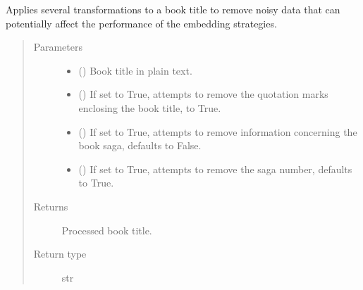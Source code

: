 \documentclass[letterpaper,10pt,english]{sphinxmanual}
\begin{document}
\begin{fulllineitems}
\label{\detokenize{code:code_utils.utils.clean_book_title}}
Applies several transformations to a book title to remove noisy data that
can potentially affect the performance of the embedding strategies.
\begin{quote}\begin{description}
\item[{Parameters}] \leavevmode\begin{itemize}
\item {} 
 () \textendash{} Book title in plain text.

\item {} 
 (\sphinxstyleliteralemphasis{\sphinxupquote{, }}) \textendash{} If set to True, attempts to remove the quotation
marks enclosing the book title, to True.

\item {} 
 (\sphinxstyleliteralemphasis{\sphinxupquote{, }}) \textendash{} If set to True, attempts to remove information concerning
the book saga, defaults to False.

\item {} 
 (\sphinxstyleliteralemphasis{\sphinxupquote{, }}) \textendash{} If set to True, attempts to remove the saga number,
defaults to True.

\end{itemize}

\item[{Returns}] \leavevmode
Processed book title.

\item[{Return type}] \leavevmode
str

\end{description}\end{quote}

\end{fulllineitems}
\end{document}
